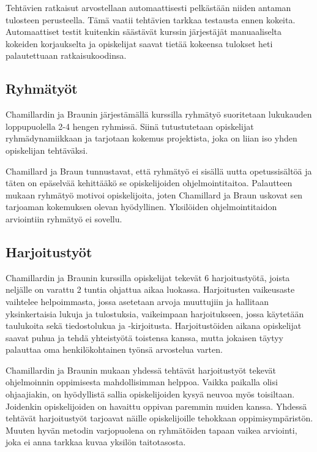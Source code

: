 \documentclass[finnish]{../tktltiki2}
\theoremstyle{definition}
\theoremstyle{remark}
\begin{document}
Tehtävien ratkaisut arvostellaan automaattisesti pelkästään niiden antaman tulosteen perusteella. Tämä vaatii tehtävien tarkkaa testausta ennen kokeita. Automaattiset testit kuitenkin säästävät kurssin järjestäjät manuaaliselta kokeiden korjaukselta ja opiskelijat saavat tietää kokeensa tulokset heti palautettuaan ratkaisukoodinsa.

\subsection{Ryhmätyöt}

Chamillardin ja Braunin järjestämällä kurssilla ryhmätyö suoritetaan lukukauden loppupuolella 2-4 hengen ryhmissä. Siinä tutustutetaan opiskelijat ryhmädynamiikkaan ja tarjotaan kokemus projektista, joka on liian iso yhden opiskelijan tehtäväksi.

Chamillard ja Braun tunnustavat, että ryhmätyö ei sisällä uutta opetussisältöä ja täten on epäselvää kehittääkö se opiskelijoiden ohjelmointitaitoa. Palautteen mukaan ryhmätyö motivoi opiskelijoita, joten Chamillard ja Braun uskovat sen tarjoaman kokemuksen olevan hyödyllinen. Yksilöiden ohjelmointitaidon arviointiin ryhmätyö ei sovellu.

\subsection{Harjoitustyöt}

Chamillardin ja Braunin kurssilla opiskelijat tekevät 6 harjoitustyötä, joista neljälle on varattu 2 tuntia ohjattua aikaa luokassa. Harjoitusten vaikeusaste vaihtelee helpoimmasta, jossa asetetaan arvoja muuttujiin ja hallitaan yksinkertaisia lukuja ja tulostuksia, vaikeimpaan harjoitukseen, jossa käytetään taulukoita sekä tiedostolukua ja -kirjoitusta. Harjoitustöiden aikana opiskelijat saavat puhua ja tehdä yhteistyötä toistensa kanssa, mutta jokaisen täytyy palauttaa oma henkilökohtainen työnsä arvostelua varten.

Chamillardin ja Braunin mukaan yhdessä tehtävät harjoitustyöt tekevät ohjelmoinnin oppimisesta mahdollisimman helppoa. Vaikka paikalla olisi ohjaajiakin, on hyödyllistä sallia opiskelijoiden kysyä neuvoa myös toisiltaan. Joidenkin opiskelijoiden on havaittu oppivan paremmin muiden kanssa. Yhdessä tehtävät harjoitustyöt tarjoavat näille opiskelijoille tehokkaan oppimisympäristön. Muuten hyvän metodin varjopuolena on ryhmätöiden tapaan vaikea arviointi, joka ei anna tarkkaa kuvaa yksilön taitotasosta.
\end{document}
